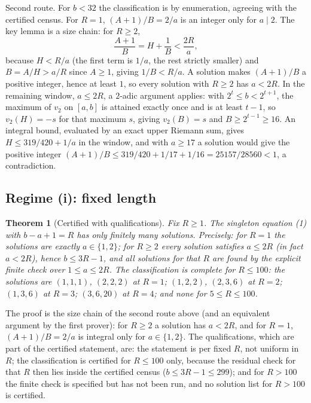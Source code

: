 \documentclass[11pt]{article}
\newtheorem{theorem}{Theorem}[section]
\theoremstyle{remark}
\begin{document}
Second route. For $b < 32$ the classification is by enumeration, agreeing with the certified census. For $R = 1$, $(A+1)/B = 2/a$ is an integer only for $a \mid 2$. The key lemma is a size chain: for $R \ge 2$,
\[
\frac{A+1}{B} = H + \frac{1}{B} < \frac{2R}{a},
\]
because $H < R/a$ (the first term is $1/a$, the rest strictly smaller) and $B = A/H > a/R$ since $A \ge 1$, giving $1/B < R/a$. A solution makes $(A+1)/B$ a positive integer, hence at least $1$, so every solution with $R \ge 2$ has $a < 2R$. In the remaining window, $a \le 2R$, a $2$-adic argument applies: with $2^t \le b < 2^{t+1}$, the maximum of $v_2$ on $[a,b]$ is attained exactly once and is at least $t - 1$, so $v_2(H) = -s$ for that maximum $s$, giving $v_2(B) = s$ and $B \ge 2^{t-1} \ge 16$. An integral bound, evaluated by an exact upper Riemann sum, gives $H \le 319/420 + 1/a$ in the window, and with $a \ge 17$ a solution would give the positive integer $(A+1)/B \le 319/420 + 1/17 + 1/16 = 25157/28560 < 1$, a contradiction.

\subsection{Regime (i): fixed length}

\begin{theorem}[Certified with qualifications]
Fix $R \ge 1$. The singleton equation (1) with $b - a + 1 = R$ has only finitely many solutions. Precisely: for $R = 1$ the solutions are exactly $a \in \{1, 2\}$; for $R \ge 2$ every solution satisfies $a \le 2R$ (in fact $a < 2R$), hence $b \le 3R - 1$, and all solutions for that $R$ are found by the explicit finite check over $1 \le a \le 2R$. The classification is complete for $R \le 100$: the solutions are $(1,1,1)$, $(2,2,2)$ at $R = 1$; $(1,2,2)$, $(2,3,6)$ at $R = 2$; $(1,3,6)$ at $R = 3$; $(3,6,20)$ at $R = 4$; and none for $5 \le R \le 100$.
\end{theorem}

The proof is the size chain of the second route above (and an equivalent argument by the first prover): for $R \ge 2$ a solution has $a < 2R$, and for $R = 1$, $(A+1)/B = 2/a$ is integral only for $a \in \{1,2\}$. The qualifications, which are part of the certified statement, are: the statement is per fixed $R$, not uniform in $R$; the classification is certified for $R \le 100$ only, because the residual check for that $R$ then lies inside the certified census ($b \le 3R - 1 \le 299$); and for $R > 100$ the finite check is specified but has not been run, and no solution list for $R > 100$ is certified.
\end{document}
